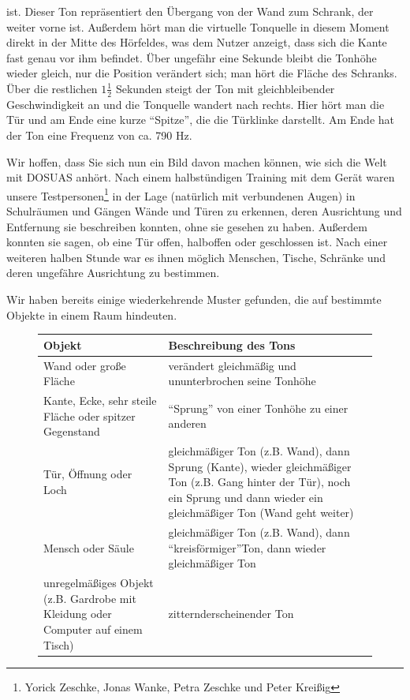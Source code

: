 \documentclass[a4paper,12pt,ngerman]{scrartcl}
\begin{document}
ist. Dieser Ton repräsentiert den Übergang von der Wand zum Schrank, der weiter vorne ist. Außerdem hört
man die virtuelle Tonquelle in diesem Moment direkt in der Mitte des Hörfeldes, was dem Nutzer anzeigt, dass sich
die Kante fast genau vor ihm befindet. Über ungefähr eine Sekunde bleibt die Tonhöhe wieder gleich, nur die Position
verändert sich; man hört die Fläche des Schranks. Über die restlichen $1\frac{1}{2}$ Sekunden steigt der Ton mit 
gleichbleibender Geschwindigkeit an und die Tonquelle wandert nach rechts.
Hier hört man die Tür und am Ende eine kurze \enquote{Spitze}, die die Türklinke darstellt. Am Ende hat der Ton
eine Frequenz von ca. 790 Hz.\par 
Wir hoffen, dass Sie sich nun ein Bild davon machen können, wie sich die Welt mit DOSUAS anhört. Nach einem
halbstündigen Training mit dem Gerät waren unsere Testpersonen\footnote{Yorick Zeschke, Jonas Wanke, Petra Zeschke und Peter Kreißig} in der Lage (natürlich mit verbundenen Augen) in Schulräumen und Gängen
Wände und Türen zu erkennen, deren Ausrichtung und Entfernung sie beschreiben konnten, ohne sie gesehen zu haben.
Außerdem konnten sie sagen, ob eine Tür offen, halboffen oder geschlossen ist. Nach einer weiteren halben Stunde
war es ihnen möglich Menschen, Tische, Schränke und deren ungefähre Ausrichtung zu bestimmen. \par
Wir haben bereits einige wiederkehrende Muster gefunden, die auf bestimmte Objekte in einem Raum hindeuten. 
\begin{figure}[h]
	\begin{tabular}{| p{} | p{} |}
		\hline
		Objekt & Beschreibung des Tons \\ \hline
		Wand oder große Fläche & verändert gleichmäßig und ununterbrochen seine Tonhöhe \\ \hline
		Kante, Ecke, sehr steile Fläche oder spitzer Gegenstand & \enquote{Sprung} von einer Tonhöhe zu einer 
		anderen \\ \hline
		Tür, Öffnung oder Loch & gleichmäßiger Ton (z.B. Wand), dann Sprung (Kante), wieder gleichmäßiger Ton
		(z.B. Gang hinter der Tür), noch ein Sprung und dann wieder ein gleichmäßiger Ton (Wand geht weiter) \\ \hline 
		Mensch oder Säule & gleichmäßiger Ton (z.B. Wand), dann \enquote{kreisförmiger}\footnotemark Ton, dann wieder gleichmäßiger Ton \\ \hline
		unregelmäßiges Objekt (z.B. Gardrobe mit Kleidung oder Computer auf einem Tisch) & zitternd\footnotemark erscheinender Ton \\ \hline 
	\end{tabular}
\end{figure} \par
\end{document}
